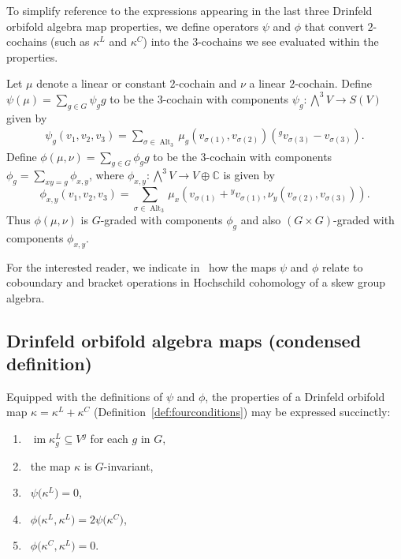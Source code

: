 \documentclass[pdftex]{sigma}
\numberwithin{equation}{section}
\newcommand{\actby}[1]{{}^{#1}}
\DeclareMathOperator{\Alt}{Alt}
\DeclareMathOperator{\im}{im}
\begin{document}
To simplify reference to the expressions appearing in the last three Drinfeld orbifold algebra map properties, we define operators $\psi$ and $\phi$ that convert $2$-cochains (such as $\kappa^L$ and $\kappa^C$) into the $3$-cochains we see evaluated within the properties.

\begin{Definition}%
	Let $\mu$ denote a linear or constant $2$-cochain and $\nu$ a linear $2$-cochain.
	Define $\psi(\mu)=\sum_{g\in G}\psi_gg$ to be the $3$-cochain with components $\psi_g\colon \bigwedge^3V\rightarrow S(V)$ given by
	\begin{gather*}
\psi_g(v_1,v_2,v_3)=\sum_{\sigma\in\Alt_3}\mu_g(v_{\sigma(1)},v_{\sigma(2)})(\actby{g}v_{\sigma(3)}-v_{\sigma(3)}).
	\end{gather*}
	Define $\phi(\mu,\nu)=\sum_{g\in G}\phi_g g$ to be the $3$-cochain
	with components $\phi_g=\sum_{xy=g}\phi_{x,y}$, where $\phi_{x,y}\colon \bigwedge^3 V\to V\oplus\mathbb{C}$ is given by
	\begin{equation}
	\label{phi}
	\phi_{x,y}(v_1,v_2,v_3)=\sum_{\sigma\in\Alt_3}\mu_x(v_{\sigma(1)}+\actby{y}v_{\sigma(1)},\nu_y(v_{\sigma(2)},v_{\sigma(3)})).
	\end{equation}
	Thus $\phi(\mu,\nu)$ is $G$-graded with components $\phi_g$ and also $(G\times G)$-graded with components $\phi_{x,y}$.
\end{Definition}

For the interested reader, we indicate in~\cite{FGK} how the maps $\psi$ and $\phi$ relate to coboundary and bracket operations in Hochschild cohomology of a skew group algebra.

\subsection{Drinfeld orbifold algebra maps (condensed definition)}%

Equipped with the definitions of $\psi$ and $\phi$, the properties of a Drinfeld orbifold map $\kappa=\kappa^L+\kappa^C$
(Definition~\ref{def:fourconditions}) may be expressed succinctly:
\begin{enumerate}	\itemsep=0pt
	\item[\eqref{PBWconditions-0}] \ $\im\kappa^L_g\subseteq V^g$ for each $g$ in $G$,
	\item[\eqref{PBWconditions-i}] \ the map $\kappa$ is $G$-invariant,
	\item[\eqref{PBWconditions-ii}] \ $\psi\big(\kappa^L\big)=0$,
	\item[\eqref{PBWconditions-iii}] \ $\phi\big(\kappa^L,\kappa^L\big)=2\psi\big(\kappa^C\big)$,
	\item[\eqref{PBWconditions-iv}] \ $\phi\big(\kappa^C,\kappa^L\big)=0$.
\end{enumerate}
\end{document}
